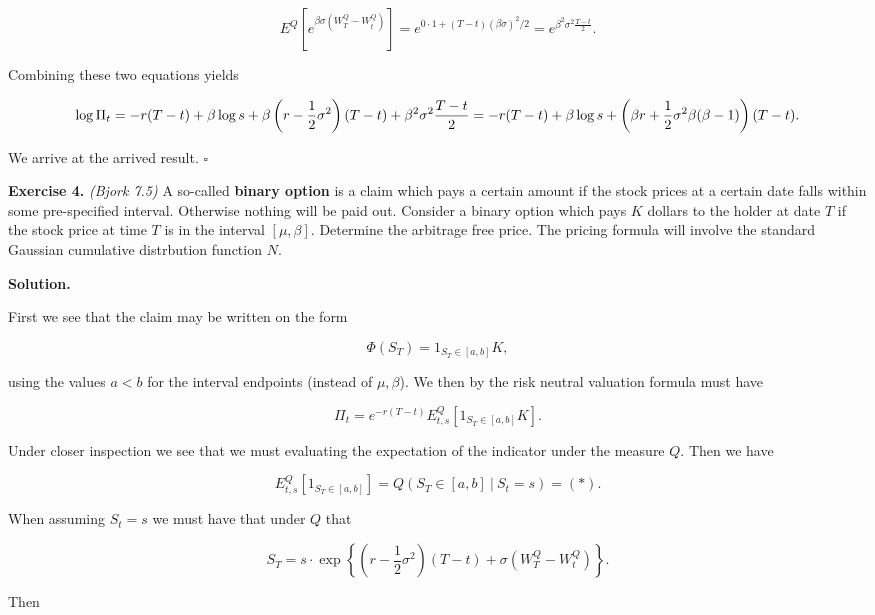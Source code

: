 \documentclass[
]{book}
\begin{document}
\[
E^Q\left[e^{\beta\sigma(W_T^Q-W_t^Q)}\right]=e^{0\cdot 1+(T-t)(\beta\sigma)^2/2}=e^{\beta^2\sigma^2\frac{T-t}{2}}.
\]

Combining these two equations yields

\[
\log \Pi_t=-r(T-t)+\beta\log s+\beta\left(r-\frac{1}{2}\sigma^2\right)(T-t)+\beta^2\sigma^2\frac{T-t}{2}\\
=-r(T-t)+\beta\log s+\left(\beta r+\frac{1}{2}\sigma^2\beta(\beta-1)\right)(T-t).
\]

We arrive at the arrived result. \(\square\)

\textbf{Exercise 4.} \emph{(Bjork 7.5)} A so-called \textbf{binary option} is a claim which pays a certain amount if the stock prices at a certain date falls within some pre-specified interval. Otherwise nothing will be paid out. Consider a binary option which pays \(K\) dollars to the holder at date \(T\) if the stock price at time \(T\) is in the interval \([\mu,\beta]\). Determine the arbitrage free price. The pricing formula will involve the standard Gaussian cumulative distrbution function \(N\).

\textbf{Solution.}

First we see that the claim may be written on the form

\[
\Phi(S_T)=1_{S_T\in [a,b]}K,
\]

using the values \(a<b\) for the interval endpoints (instead of \(\mu,\beta\)). We then by the risk neutral valuation formula must have

\[
\Pi_t=e^{-r(T-t)}E^Q_{t,s}[1_{S_T\in [a,b]}K].
\]

Under closer inspection we see that we must evaluating the expectation of the indicator under the measure \(Q\). Then we have

\[
E^Q_{t,s}[1_{S_T\in [a,b]}]=Q(S_T\in[a,b]\ \vert\ S_t=s)=(*).
\]

When assuming \(S_t=s\) we must have that under \(Q\) that

\[
S_T=s\cdot \exp\left\{\left(r-\frac{1}{2}\sigma ^2\right)(T-t)+\sigma\left(W_T^Q-W_t^Q\right)\right\}.
\]

Then
\end{document}
